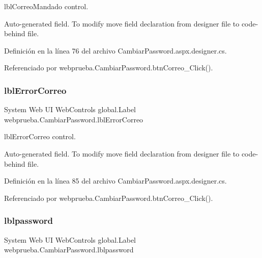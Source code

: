 lbl\+Correo\+Mandado control. 

Auto-\/generated field. To modify move field declaration from designer file to code-\/behind file. 

Definición en la línea 76 del archivo Cambiar\+Password.\+aspx.\+designer.\+cs.



Referenciado por webprueba.\+Cambiar\+Password.\+btn\+Correo\+\_\+\+Click().

\mbox{\label{classwebprueba_1_1_cambiar_password_a9cefb5bb5053c7f80c6bd8e659179377}} 
\subsubsection{\texorpdfstring{lblErrorCorreo}{lblErrorCorreo}}
{\footnotesize\ttfamily System Web UI Web\+Controls global.\+Label webprueba.\+Cambiar\+Password.\+lbl\+Error\+Correo\hspace{0.3cm}{\ttfamily [protected]}}



lbl\+Error\+Correo control. 

Auto-\/generated field. To modify move field declaration from designer file to code-\/behind file. 

Definición en la línea 85 del archivo Cambiar\+Password.\+aspx.\+designer.\+cs.



Referenciado por webprueba.\+Cambiar\+Password.\+btn\+Correo\+\_\+\+Click().

\mbox{\label{classwebprueba_1_1_cambiar_password_aa4af6c9e8848dcef0a3357461ae5eb0a}} 
\subsubsection{\texorpdfstring{lblpassword}{lblpassword}}
{\footnotesize\ttfamily System Web UI Web\+Controls global.\+Label webprueba.\+Cambiar\+Password.\+lblpassword\hspace{0.3cm}{\ttfamily [protected]}}



